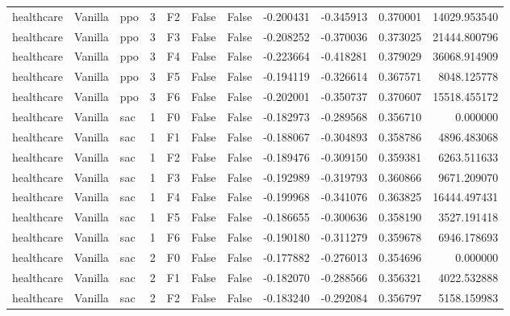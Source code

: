 \begin{tabular}{lllrlllrrrr}
healthcare & Vanilla &       ppo &     3 &  F2 &           False &            False & -0.200431 & -0.345913 & 0.370001 &     14029.953540 \\
healthcare & Vanilla &       ppo &     3 &  F3 &           False &            False & -0.208252 & -0.370036 & 0.373025 &     21444.800796 \\
healthcare & Vanilla &       ppo &     3 &  F4 &           False &            False & -0.223664 & -0.418281 & 0.379029 &     36068.914909 \\
healthcare & Vanilla &       ppo &     3 &  F5 &           False &            False & -0.194119 & -0.326614 & 0.367571 &      8048.125778 \\
healthcare & Vanilla &       ppo &     3 &  F6 &           False &            False & -0.202001 & -0.350737 & 0.370607 &     15518.455172 \\
healthcare & Vanilla &       sac &     1 &  F0 &           False &            False & -0.182973 & -0.289568 & 0.356710 &         0.000000 \\
healthcare & Vanilla &       sac &     1 &  F1 &           False &            False & -0.188067 & -0.304893 & 0.358786 &      4896.483068 \\
healthcare & Vanilla &       sac &     1 &  F2 &           False &            False & -0.189476 & -0.309150 & 0.359381 &      6263.511633 \\
healthcare & Vanilla &       sac &     1 &  F3 &           False &            False & -0.192989 & -0.319793 & 0.360866 &      9671.209070 \\
healthcare & Vanilla &       sac &     1 &  F4 &           False &            False & -0.199968 & -0.341076 & 0.363825 &     16444.497431 \\
healthcare & Vanilla &       sac &     1 &  F5 &           False &            False & -0.186655 & -0.300636 & 0.358190 &      3527.191418 \\
healthcare & Vanilla &       sac &     1 &  F6 &           False &            False & -0.190180 & -0.311279 & 0.359678 &      6946.178693 \\
healthcare & Vanilla &       sac &     2 &  F0 &           False &            False & -0.177882 & -0.276013 & 0.354696 &         0.000000 \\
healthcare & Vanilla &       sac &     2 &  F1 &           False &            False & -0.182070 & -0.288566 & 0.356321 &      4022.532888 \\
healthcare & Vanilla &       sac &     2 &  F2 &           False &            False & -0.183240 & -0.292084 & 0.356797 &      5158.159983 \\

\end{tabular}
